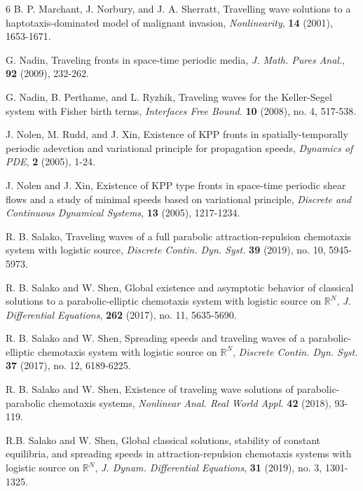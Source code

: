 \documentclass[11pt]{article} %
\theoremstyle{remark}
\theoremstyle{remark}
\numberwithin{equation}{section}
\numberwithin{figure}{section}
\numberwithin{table}{section}
\newcommand\RR{\ensuremath{\mathbb{R}}}
\begin{document}
\begin{thebibliography}{6}
   B. P. Marchant, J. Norbury, and J. A. Sherratt, Travelling wave solutions to a
haptotaxis-dominated model of malignant invasion, {\it Nonlinearity}, {\bf 14} (2001),  1653-1671.

 G. Nadin, Traveling fronts in space-time periodic media,
{\it J. Math. Pures Anal.}, {\bf 92} (2009),  232-262.



 G. 
Nadin,  B.  Perthame,   and L.  Ryzhik,
Traveling waves for the Keller-Segel system with Fisher birth terms, {\it Interfaces Free Bound.} {\bf  10}  (2008), no. 4, 517-538.


 J. Nolen, M. Rudd, and J. Xin, Existence of KPP
fronts in spatially-temporally periodic adevction and variational principle for propagation speeds, {\it
Dynamics of PDE}, {\bf 2} (2005),  1-24.


 J. Nolen and J. Xin, Existence of KPP type fronts in
space-time periodic shear flows and a study of minimal speeds based on variational principle, {\it Discrete and
Continuous Dynamical Systems}, {\bf 13} (2005),  1217-1234.



 R. B. Salako, 
Traveling waves of a full parabolic attraction-repulsion chemotaxis system with logistic source,
{\it 
Discrete Contin. Dyn. Syst.} {\bf  39}  (2019), no. 10, 5945-5973.

 R. B. Salako and W.  Shen, Global existence and asymptotic behavior of classical solutions to a parabolic-elliptic chemotaxis system with logistic source on 
$\RR^N$, {\it 
J. Differential Equations}, {\bf  262} (2017), no. 11, 5635-5690.



 R. B. Salako and W. Shen,
Spreading speeds and traveling waves of a parabolic-elliptic chemotaxis system with logistic source on $\RR^N$,
{\it 
Discrete Contin. Dyn. Syst.} {\bf  37} (2017), no. 12, 6189-6225.

 R. B. Salako and W.  Shen,
Existence of traveling wave solutions of parabolic-parabolic chemotaxis systems,
{\it 
Nonlinear Anal. Real World Appl.}  {\bf  42} (2018), 93-119.


 R.B. Salako and W. Shen, 
Global classical solutions, stability of constant equilibria, and spreading speeds in attraction-repulsion chemotaxis systems with logistic source on $\RR^N$,
{\it 
J. Dynam. Differential Equations}, {\bf  31} (2019), no. 3, 1301-1325.



\end{thebibliography}
\end{document}
